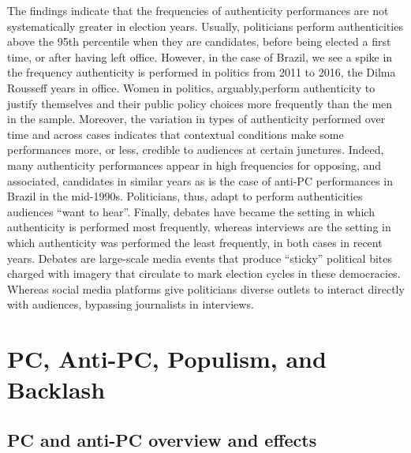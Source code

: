 \documentclass[smallextended]{svjour3}       %
\begin{document}
The findings indicate that the frequencies of authenticity performances
are not systematically greater in election years. Usually, politicians
perform authenticities above the 95th percentile when they are
candidates, before being elected a first time, or after having left
office. However, in the case of Brazil, we see a spike in the frequency
authenticity is performed in politics from 2011 to 2016, the Dilma
Rousseff years in office. Women in politics, arguably,perform
authenticity to justify themselves and their public policy choices more
frequently than the men in the sample. Moreover, the variation in types
of authenticity performed over time and across cases indicates that
contextual conditions make some performances more, or less, credible to
audiences at certain junctures. Indeed, many authenticity performances
appear in high frequencies for opposing, and associated, candidates in
similar years as is the case of anti-PC performances in Brazil in the
mid-1990s. Politicians, thus, adapt to perform authenticities audiences
``want to hear''. Finally, debates have became the setting in which
authenticity is performed most frequently, whereas interviews are the
setting in which authenticity was performed the least frequently, in
both cases in recent years. Debates are large-scale media events that
produce ``sticky'' political bites charged with imagery that circulate
to mark election cycles in these democracies. Whereas social media
platforms give politicians diverse outlets to interact directly with
audiences, bypassing journalists in interviews.

\hypertarget{pc-anti-pc-populism-and-backlash}{%
\section{PC, Anti-PC, Populism, and
Backlash}\label{pc-anti-pc-populism-and-backlash}}

\hypertarget{pc-and-anti-pc-overview-and-effects}{%
\subsection{PC and anti-PC overview and
effects}\label{pc-and-anti-pc-overview-and-effects}}
\end{document}
